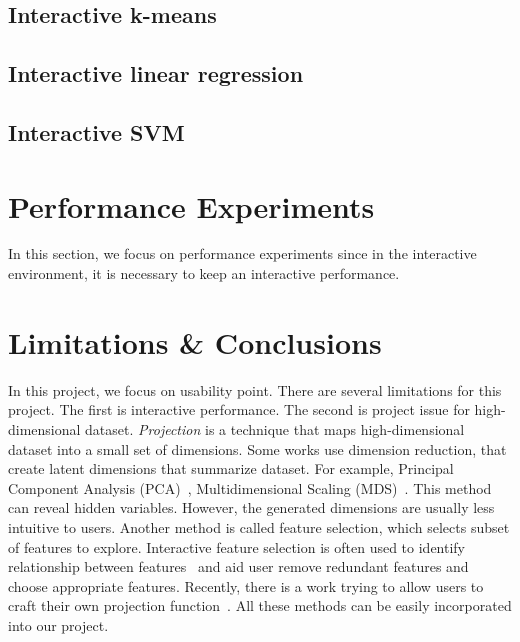 \documentclass{article}
\begin{document}
 
\subsection{Interactive k-means}
\subsection{Interactive linear regression}
\subsection{Interactive SVM}

\section{Performance Experiments}
In this section, we focus on performance experiments since in the interactive environment, it is necessary to keep an interactive performance. \\

\section{Limitations \& Conclusions}
In this project, we focus on usability point. There are several limitations for this project. The first is interactive performance. The second is project issue for high-dimensional dataset. \emph{Projection} is a technique that maps high-dimensional dataset into a small set of dimensions. Some works use dimension reduction, that create latent dimensions that summarize dataset. For example, Principal Component Analysis (PCA)~\cite{jolliffe2002principal}, Multidimensional Scaling (MDS)~\cite{mead1992review}. This method can reveal hidden variables. However, the generated dimensions are usually less intuitive to users. Another method is called feature selection, which selects subset of features to explore. Interactive feature selection is often used to identify relationship between features~\cite{guo2003coordinating, yang2004value} and aid user remove redundant features and choose appropriate features. Recently, there is a work trying to allow users to craft their own projection function~\cite{gleicher2013explainers}.  All these methods can be easily incorporated into our project.  \\



\end{document}
